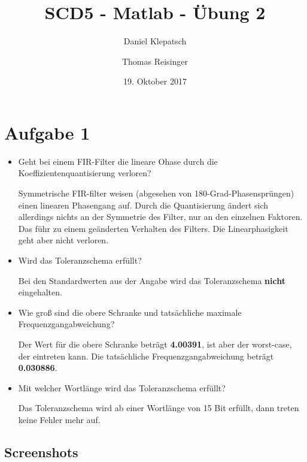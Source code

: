 


\title{SCD5 - Matlab - Übung 2}
\date{19. Oktober 2017}
\author{Daniel Klepatsch \and Thomas Reisinger}
        
\maketitle

\newpage



\tableofcontents

\newpage

\section{Aufgabe 1}

\begin{itemize}
\item Geht bei einem FIR-Filter die lineare Ohase durch die Koeffizientenquantisierung verloren?

Symmetrische FIR-filter weisen (abgesehen von 180-Grad-Phasensprüngen) einen linearen Phasengang auf. Durch die Quantisierung ändert sich allerdings nichts an der Symmetrie des Filter, nur an den einzelnen Faktoren. Das führ zu einem geänderten Verhalten des Filters. Die Linearphasigkeit geht aber nicht verloren.
\newline
\item Wird das Toleranzschema erfüllt?

Bei den Standardwerten aus der Angabe wird das Toleranzschema \textbf{nicht} eingehalten.
\newline
\item Wie groß sind die obere Schranke und tatsächliche maximale Frequenzgangabweichung?

Der Wert für die obere Schranke beträgt \textbf{4.00391}, ist aber der worst-case, der eintreten kann. Die tatsächliche Frequenzgangabweichung beträgt \textbf{0.030886}.
\newline
\item Mit welcher Wortlänge wird das Toleranzschema erfüllt?

Das Toleranzschema wird ab einer Wortlänge von 15 Bit erfüllt, dann treten keine Fehler mehr auf.
\end{itemize}

\subsection{Screenshots}

